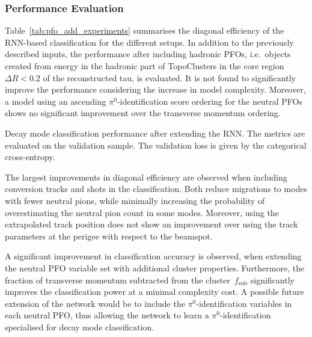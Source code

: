 \subsubsection{Performance Evaluation}

Table~\ref{tab:pfo_add_experiments} summarises the diagonal efficiency of the
RNN-based classification for the different setups. In addition to the previously
described inputs, the performance after including hadronic PFOs, i.e.\ objects
created from energy in the hadronic part of TopoClusters in the core
region~$\Delta R < 0.2$ of the reconstructed tau, is evaluated. It is not found
to significantly improve the performance considering the increase in model
complexity. Moreover, a model using an ascending $\pi^0$-identification score
ordering for the neutral PFOs shows no significant improvement over the
transverse momentum ordering.

\begin{table}[htb]
  \centering
  {\small}
  \caption{Decay mode classification performance after extending the RNN. The
    metrics are evaluated on the validation sample. The validation loss is given
    by the categorical cross-entropy.}
  \label{tab:pfo_add_experiments}
\end{table}

The largest improvements in diagonal efficiency are observed when including
conversion tracks and shots in the classification. Both reduce migrations to
modes with fewer neutral pions, while minimally increasing the probability of
overestimating the neutral pion count in some modes. Moreover, using the
extrapolated track position does not show an improvement over using the track
parameters at the perigee with respect to the beamspot.

A significant improvement in classification accuracy is observed, when extending
the neutral PFO variable set with additional cluster properties. Furthermore,
the fraction of transverse momentum subtracted from the cluster~$f_\text{sub}$
significantly improves the classification power at a minimal complexity cost. A
possible future extension of the network would be to include the
$\pi^0$-identification variables in each neutral PFO, thus allowing the network
to learn a $\pi^0$-identification specialised for decay mode classification.

